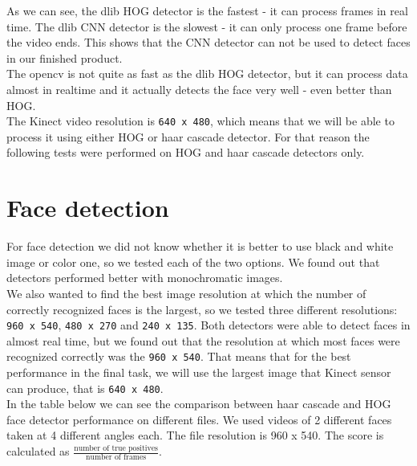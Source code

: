 \documentclass[12pt,a4paper]{article}
\begin{document}
	As we can see, the dlib HOG detector is the fastest - it can process frames in real time. The dlib CNN detector is the slowest - it can only process one frame before the video ends. This shows that the CNN detector can not be used to detect faces in our finished product. \\
	
	The opencv is not quite as fast as the dlib HOG detector, but it can process data almost in realtime and it actually detects the face very well - even better than HOG. \\
	
	The Kinect video resolution is \texttt{640 x 480}, which means that we will be able to process it using either HOG or haar cascade detector. For that reason the following tests were performed on HOG and haar cascade detectors only. \\
	
	\section{Face detection}
	
	For face detection we did not know whether it is better to use black and white image or color one, so we tested each of the two options. We found out that detectors performed better with monochromatic images. \\
	
	We also wanted to find the best image resolution at which the number of correctly recognized faces is the largest, so we tested three different resolutions: \texttt{960 x 540}, \texttt{480 x 270} and \texttt{240 x 135}. Both detectors were able to detect faces in almost real time, but we found out that the resolution at which most faces were recognized correctly was the \texttt{960 x 540}. That means that for the best performance in the final task, we will use the largest image that Kinect sensor can produce, that is \texttt{640 x 480}. \\
	
	In the table below we can see the comparison between haar cascade and HOG face detector performance on different files. We used videos of 2 different faces taken at 4 different angles each. The file resolution is 960 x 540. The score is calculated as $\frac{\text{number of true positives}}{\text{number of frames}}$.
	
\end{document}
